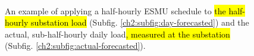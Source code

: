 \begin{figure}\centering
	\\
	\caption{An example of applying a half-hourly ESMU schedule to \hl{the half-hourly substation load} (Subfig. \ref{ch2:subfig:day-forecasted}) and the actual, sub-half-hourly daily load\hl{, measured at the substation} (Subfig. \ref{ch2:subfig:actual-forecasted}).}
	\label{ch2:fig:cost-sample}
\end{figure}